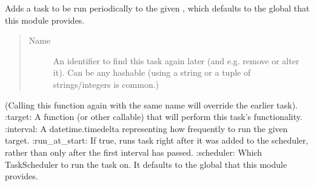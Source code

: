 \documentclass[letterpaper,10pt,english]{sphinxmanual}
\begin{document}

\begin{fulllineitems}
\label{\detokenize{periodic_tasks:periodic_tasks.add_periodic_task}}
Adds a task to be run periodically to the given , which defaults to the global  that this module provides.
\begin{quote}\begin{description}
\item[{Name}] \leavevmode
An identifier to find this task again later (and e.g. remove or alter it). Can be any hashable (using a string or a tuple of strings/integers is common.)

\end{description}\end{quote}

(Calling this function again with the same name will override the earlier task).
:target: A function (or other callable) that will perform this task’s functionality.
:interval: A datetime.timedelta representing how frequently to run the given target.
:run\_at\_start: If true, runs task right after it was added to the scheduler, rather than only after the first interval has passed.
:scheduler: Which TaskScheduler to run the task on. It defaults to the global  that this module provides.

\end{fulllineitems}


\begin{fulllineitems}
\label{\detokenize{periodic_tasks:periodic_tasks.bar}}
\end{fulllineitems}


\begin{fulllineitems}
\label{\detokenize{periodic_tasks:periodic_tasks.baz}}
\end{fulllineitems}
\end{document}
